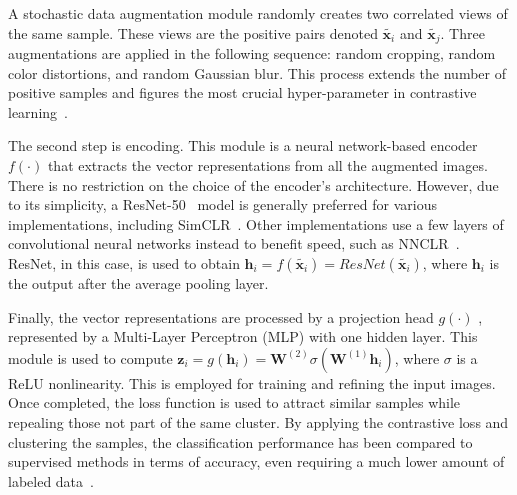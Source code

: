\documentclass[12pt]{article}
\begin{document}
A stochastic data augmentation module randomly creates two correlated views of the same sample. These views are the positive pairs denoted ${\tilde{\boldsymbol{x}_i}}$ and $\tilde{\boldsymbol{x}_j}$. Three augmentations are applied in the following sequence: random cropping, random color distortions, and random Gaussian blur. This process extends the number of positive samples and figures the most crucial hyper-parameter in contrastive learning~\citep{chen2020}.

The second step is encoding. This module is a neural network-based encoder $f(\cdot)$ that extracts the vector representations from all the augmented images. There is no restriction on the choice of the encoder's architecture. However, due to its simplicity, a ResNet-50~\citep{zhang2016} model is generally preferred for various implementations, including SimCLR~\citep{chen2020}. Other implementations use a few layers of convolutional neural networks instead to benefit speed, such as NNCLR~\citep{dwibedi2021}. ResNet, in this case, is used to obtain $ \boldsymbol{h}_i=f(\tilde{\boldsymbol{x}_i})=ResNet(\tilde{\boldsymbol{x}_i})$, where $\boldsymbol{h}_i$ is the output after the average pooling layer.

Finally, the vector representations are processed by a projection head $g(\cdot)$ , represented by a Multi-Layer Perceptron (MLP) with one hidden layer. This module is used to compute $\boldsymbol{z}_i = g(\boldsymbol{h}_i) = \boldsymbol{W}^{(2)}\sigma(\boldsymbol{W}^{(1)}\boldsymbol{h}_i)$, where $\sigma$ is a ReLU nonlinearity. This is employed for training and refining the input images. Once completed, the loss function is used to attract similar samples while repealing those not part of the same cluster. By applying the contrastive loss and clustering the samples, the classification performance has been compared to supervised methods in terms of accuracy, even requiring a much lower amount of labeled data~\citep{chen2020}.
\end{document}

